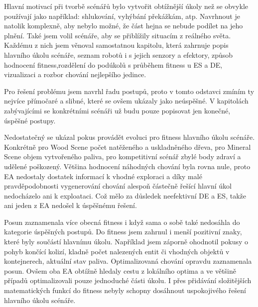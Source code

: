 Hlavní motivací při tvorbě scénářů bylo vytvořit obtížnější úkoly než se obvykle používají jako například: shlukování, vyhýbání překážkám, atp. Navrhnout je natolik komplexně, aby nebylo možné, že část hejna se nebude podílet na jeho plnění. Také jsem volil scénáře, aby se přiblížily situacím z reálného světa. Každému z nich jsem věnoval samostatnou kapitolu, která zahrnuje popis hlavního úkolu scénáře, seznam robotů i s jejich senzory a efektory, způsob hodnocení fitness,rozdělení do podúkolů s průběhem fitness u ES a DE, vizualizaci a rozbor chování nejlepšího jedince.  
\par
Pro řešení problému jsem navrhl řadu postupů, proto v tomto odstavci zmíním ty nejvíce přímočaré a slibné, které se ovšem ukázaly  jako neúspěšné. V kapitolách zabývajícími se konkrétními scénáři už budu pouze popisovat jen konečné, úspěšné postupy.
\par
Nedostatečný se ukázal pokus provádět evoluci pro fitness hlavního úkolu scénáře. Konkrétně pro Wood Scene počet natěženého a uskladněného dřeva, pro Mineral Scene objem vytvořeného paliva, pro kompetitivní scénář zbylé body zdraví a udělené poškozený. Většina hodnocení náhodných chování byla rovna nule, proto EA nedostaly dostatek informací k vhodné exploraci a díky malé pravděpodobnosti vygenerování chování alespoň částečně řešící hlavní úkol nedocházelo ani k exploataci. Což mělo za důsledek neefektivní  DE a ES, takže ani jeden z EA nedošel k úspěšnému řešení. 
\par
Posun zaznamenala více obecná fitness i když sama o sobě také nedosáhla do kategorie úspěšných postupů. Do fitness jsem zahrnul i menší pozitivní znaky, které byly součástí hlavnímu úkolu. Například jsem záporně ohodnotil pokusy o pohyb končící kolizí, kladně počet nalezených entit či vhodných objektů v kontejnerech, aktuální stav paliva. Optimalizovaná chování opravdu zaznamenala posun. Ovšem oba EA obtížně hledaly cestu z lokálního optima a ve většině případů optimalizovali pouze jednoduché části úkolu. I přes přidávání složitějších matematických funkcí do fitness nebyly schopny dosáhnout uspokojivého řešení hlavního úkolu scénáře.  
